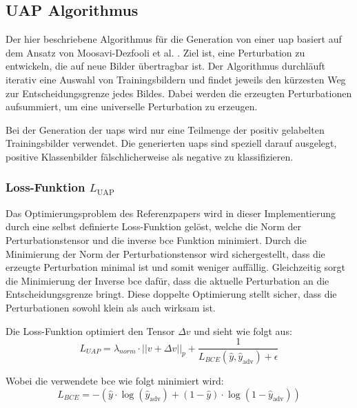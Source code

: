 \subsection{UAP Algorithmus} \label{chap:UAP}

Der hier beschriebene Algorithmus für die Generation von einer \acrfull{uap} basiert auf dem Ansatz von Moosavi-Dezfooli et al. \cite{moosavi-dezfooli_universal_2017}. Ziel ist, eine Perturbation zu entwickeln, die auf neue Bilder übertragbar ist. Der Algorithmus durchläuft iterativ eine Auswahl von Trainingsbildern und findet jeweils den kürzesten Weg zur Entscheidungsgrenze jedes Bildes. Dabei werden die erzeugten Perturbationen aufsummiert, um eine universelle Perturbation zu erzeugen.

Bei der Generation der \acrshort{uap}s wird nur eine Teilmenge der positiv gelabelten Trainingsbilder verwendet. Die generierten \acrshort{uap}s sind speziell darauf ausgelegt, positive Klassenbilder fälschlicherweise als negative zu klassifizieren.

\subsubsection{Loss-Funktion $L_{\text{UAP}}$}
Das Optimierungsproblem des Referenzpapers \cite{moosavi-dezfooli_universal_2017} wird in dieser Implementierung durch eine selbst definierte Loss-Funktion gelöst, welche die Norm der Perturbationstensor und die inverse \acrlong{bce} Funktion minimiert. Durch die Minimierung der Norm der Perturbationstensor wird sichergestellt, dass die erzeugte Perturbation minimal ist und somit weniger auffällig. Gleichzeitig sorgt die Minimierung der Inverse \acrlong{bce} dafür, dass die aktuelle Perturbation an die Entscheidungsgrenze bringt. Diese doppelte Optimierung stellt sicher, dass die Perturbationen sowohl klein als auch wirksam ist.


Die Loss-Funktion optimiert den Tensor $\Delta v$ und sieht wie folgt aus:
\begin{equation}
    L_{UAP} = \lambda_{norm} \cdot ||v + \Delta v||_p + \frac{1}{L_{BCE}(\hat{y}, \hat{y}_{\text{adv}}) + \epsilon}
\label{Loss}
\end{equation}

Wobei die verwendete \acrlong{bce} wie folgt minimiert wird:
\begin{equation}
L_{BCE} = - (\hat{y} \cdot \log(\hat{y}_{\text{adv}}) + (1-\hat{y}) \cdot \log(1-\hat{y}_{\text{adv}}))
\label{eq:BCE}
\end{equation}

